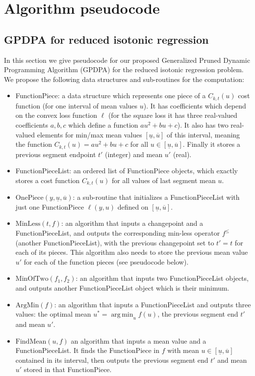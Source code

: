 \documentclass{article}
\newcommand{\FCC}{C}
\DeclareMathOperator*{\argmin}{arg\,min}
\begin{document}
\section{Algorithm pseudocode}

\subsection{GPDPA for reduced isotonic regression}
In this section we give pseudocode for our proposed Generalized Pruned
Dynamic Programming Algorithm (GPDPA) for the reduced isotonic
regression problem. We propose the following data structures and
sub-routines for the computation:
\begin{itemize}
\item FunctionPiece: a data structure which represents one piece of a
  $C_{k,t}(u)$ cost function (for one interval of mean values $u$). It
  has coefficients which depend on the convex loss function $\ell$
  (for the square loss it has three real-valued coefficients $a,b,c$
  which define a function $au^2 + bu + c$). It also has two
  real-valued elements for min/max mean values
  $[\underline u, \overline u]$ of this interval, meaning the function
  $C_{k,t}(u)=au^2 + bu + c$ for all
  $u\in[\underline u, \overline u]$. Finally it stores a previous
  segment endpoint $t'$ (integer) and mean $u'$ (real).
\item FunctionPieceList: an ordered list of FunctionPiece objects,
  which exactly stores a cost function $\FCC_{k,t}(u)$ for all values
  of last segment mean $u$.
\item $\text{OnePiece}(y, \underline u, \overline u)$: a sub-routine
  that initializes a FunctionPieceList with just one FunctionPiece
  $\ell(y, u)$ defined on $[\underline u, \overline u]$.
\item $\text{MinLess}(t, f)$: an algorithm that inputs a changepoint
  and a FunctionPieceList, and outputs the corresponding min-less
  operator $f^\leq$ (another FunctionPieceList), with the previous
  changepoint set to $t'=t$ for each of its pieces. This algorithm
  also needs to store the previous mean value $u'$ for each of the
  function pieces (see pseudocode below). 
\item $\text{MinOfTwo} (f_1, f_2)$: an algorithm that inputs two
  FunctionPieceList objects, and outputs another FunctionPieceList
  object which is their minimum. 
\item $\text{ArgMin}(f)$: an algorithm that inputs a FunctionPieceList
  and outputs three values: the optimal mean $u^*=\argmin_u f(u)$, the
  previous segment end $t'$ and mean $u'$.
\item $\text{FindMean}(u, f)$ an algorithm that inputs a mean value
  and a FunctionPieceList. It finds the FunctionPiece in $f$ with mean
  $u\in[\underline u, \overline u]$ contained in its interval, then
  outputs the previous segment end $t'$ and mean $u'$ stored in that
  FunctionPiece.
\end{itemize}
\end{document}
